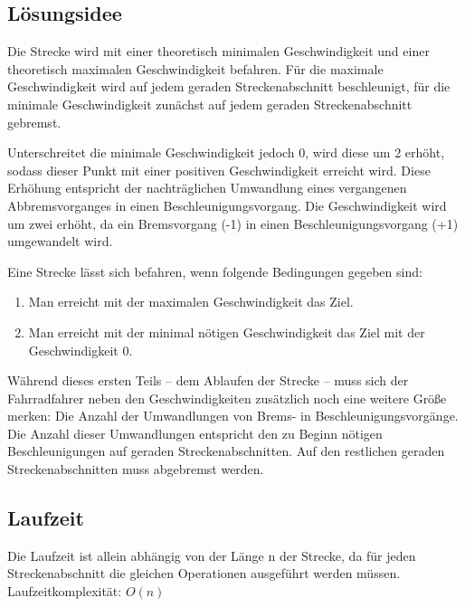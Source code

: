 \subsection {Lösungsidee}
	Die Strecke wird mit einer theoretisch minimalen Geschwindigkeit und einer theoretisch maximalen Geschwindigkeit befahren. 
	Für die maximale Geschwindigkeit wird auf jedem geraden Streckenabschnitt beschleunigt, für die minimale Geschwindigkeit zunächst auf jedem geraden Streckenabschnitt gebremst.

	Unterschreitet die minimale Geschwindigkeit jedoch 0, wird diese um 2 erhöht, sodass dieser Punkt mit einer positiven Geschwindigkeit erreicht wird.
	Diese Erhöhung entspricht der nachträglichen Umwandlung eines vergangenen Abbremsvorganges in einen Beschleunigungsvorgang. Die Geschwindigkeit wird um zwei erhöht, da ein Bremsvorgang (-1) in einen Beschleunigungsvorgang (+1) umgewandelt wird.
	
	Eine Strecke lässt sich befahren, wenn folgende Bedingungen gegeben sind:
	\begin{enumerate}
		\item Man erreicht mit der maximalen Geschwindigkeit das Ziel.
		\item Man erreicht mit der minimal nötigen Geschwindigkeit das Ziel mit der Geschwindigkeit 0.
	\end{enumerate}

	Während dieses ersten Teils – dem Ablaufen der Strecke – muss sich der Fahrradfahrer neben den Geschwindigkeiten zusätzlich noch
	eine weitere Größe merken: Die Anzahl der Umwandlungen von Brems- in Beschleunigungsvorgänge. Die Anzahl dieser Umwandlungen entspricht
	den zu Beginn nötigen Beschleunigungen auf geraden Streckenabschnitten. Auf den restlichen geraden Streckenabschnitten muss abgebremst werden.
\subsection{Laufzeit}
	Die Laufzeit ist allein abhängig von der Länge n der Strecke, da für jeden Streckenabschnitt die gleichen Operationen ausgeführt werden müssen. Laufzeitkomplexität: \(O(n)\)
